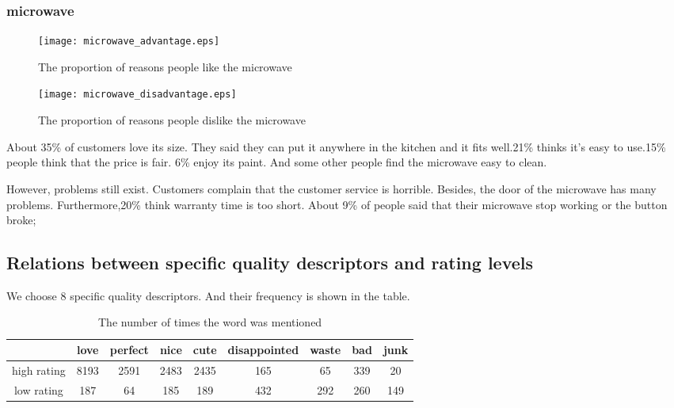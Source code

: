 \documentclass{mcmthesis}
\begin{document}
\subsubsection{microwave}
\begin{figure}[H]
	\begin{minipage}[t]{0.5\textwidth}
		\centering
		\texttt{[image: microwave\_advantage.eps]}
		\caption{The proportion of reasons people like the microwave\label{fig:1}}
	\end{minipage}
	\qquad
	\begin{minipage}[t]{0.5\textwidth}
		\centering
		\texttt{[image: microwave\_disadvantage.eps]}
		\caption{The proportion of reasons people dislike the microwave\label{fig:2}}
	\end{minipage}
\end{figure}
\begin{flushleft}
	About 35\% of customers love its size. They said they can put it anywhere in the kitchen and it fits well.21\% thinks it's easy to use.15\% people think that the price is fair.
	6\% enjoy its paint. And some other people find the microwave easy to clean.
\end{flushleft}
\begin{flushleft}
	However, problems still exist. Customers complain that the customer service is horrible. Besides, the door of the microwave has many problems. Furthermore,20\% think warranty time is too short. About 9\% of people said that their microwave stop working or the button broke;
\end{flushleft}


\subsection{Relations between specific quality descriptors and rating levels}
We choose 8 specific quality descriptors. And their frequency is shown in the table.
\begin{table}[H]
	\centering
	\caption{The number of times the word was mentioned}
	\begin{tabular}{|c|c|c|c|c|c|c|c|c|}
		\hline 
		& love & perfect & nice & cute & disappointed & waste & bad & junk \\ 
		\hline 
		high rating & 8193 & 2591 & 2483 & 2435 & 165 & 65 & 339 & 20 \\ 
		\hline 
		low rating & 187 & 64 & 185 & 189 & 432 & 292 & 260 & 149 \\ 
		\hline 
	\end{tabular}
\end{table}
\end{document}
